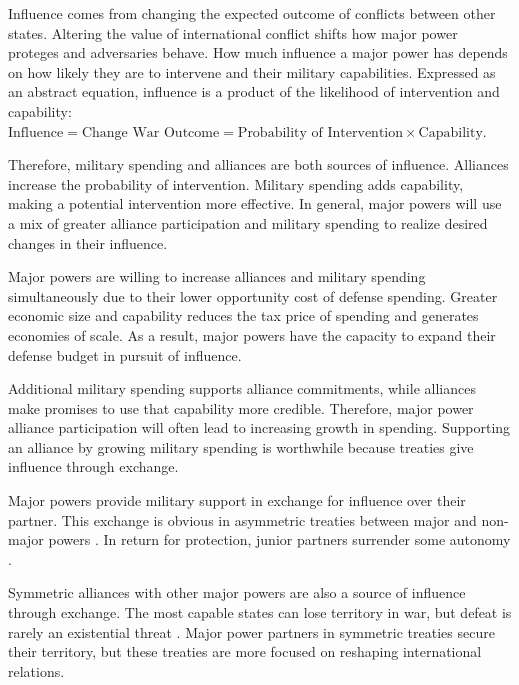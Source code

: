 \documentclass[12pt]{article}
\begin{document}
Influence comes from changing the expected outcome of conflicts between other states.
Altering the value of international conflict shifts how major power proteges and adversaries behave.  
How much influence a major power has depends on how likely they are to intervene and their military capabilities. 
Expressed as an abstract equation, influence is a product of the likelihood of intervention and capability: $\mbox{Influence} = \mbox{Change War Outcome} = \mbox{Probability of Intervention} \times \mbox{Capability}$.


Therefore, military spending and alliances are both sources of influence. 
Alliances increase the probability of intervention. 
Military spending adds capability, making a potential intervention more effective. 
In general, major powers will use a mix of greater alliance participation and military spending to realize desired changes in their influence. 


Major powers are willing to increase alliances and military spending simultaneously due to their lower opportunity cost of defense spending. 
Greater economic size and capability reduces the tax price of spending and generates economies of scale. 
As a result, major powers have the capacity to expand their defense budget in pursuit of influence.  


Additional military spending supports alliance commitments, while alliances make promises to use that capability more credible. 
Therefore, major power alliance participation will often lead to increasing growth in spending. 
Supporting an alliance by growing military spending is worthwhile because treaties give influence through exchange. 


Major powers provide military support in exchange for influence over their partner. 
This exchange is obvious in asymmetric treaties between major and non-major powers \citep{Morrow1991}. 
In return for protection, junior partners surrender some autonomy \citep{Lake2009}. 


Symmetric alliances with other major powers are also a source of influence through exchange.
The most capable states can lose territory in war, but defeat is rarely an existential threat \citep{Fazal2011}.  
Major power partners in symmetric treaties secure their territory, but these treaties are more focused on reshaping international relations. 
\end{document}
